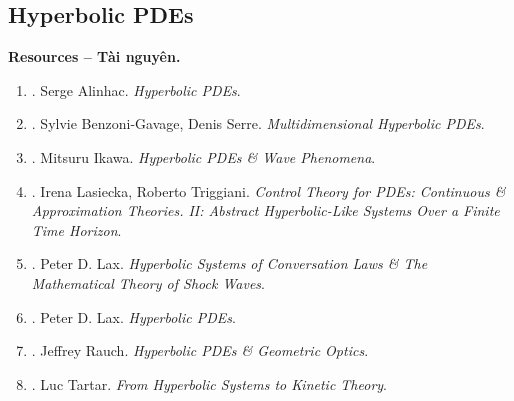 \documentclass{article}
\begin{document}
\subsection{Hyperbolic PDEs}
\textbf{\textsf{Resources -- Tài nguyên.}}
\begin{enumerate}
	\item \cite{Alinhac2009}. {\sc Serge Alinhac}. {\it Hyperbolic PDEs}.
	\item \cite{Benzoni-Gavage_Serre2007}. {\sc Sylvie Benzoni-Gavage, Denis Serre}. {\it Multidimensional Hyperbolic PDEs}.
	\item \cite{Ikawa2000}. {\sc Mitsuru Ikawa}. {\it Hyperbolic PDEs \& Wave Phenomena}.
	\item \cite{Lasiecka_Triggiani2000}. {\sc Irena Lasiecka, Roberto Triggiani}. {\it Control Theory for PDEs: Continuous \& Approximation Theories. II: Abstract Hyperbolic-Like Systems Over a Finite Time Horizon}.
	\item \cite{Lax1987}. {\sc Peter D. Lax}. {\it Hyperbolic Systems of Conversation Laws \& The Mathematical Theory of Shock Waves}.
	\item \cite{Lax2006} . {\sc Peter D. Lax}. {\it Hyperbolic PDEs}.
	\item \cite{Rauch2012}. {\sc Jeffrey Rauch}. {\it Hyperbolic PDEs \& Geometric Optics}.
	\item \cite{Tartar2008}. {\sc Luc Tartar}. {\it From Hyperbolic Systems to Kinetic Theory}.
\end{enumerate}
\end{document}
